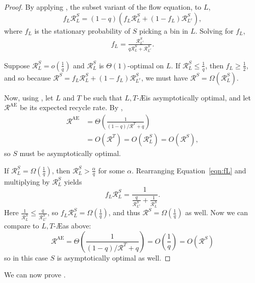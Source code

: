 \begin{proof}
	By applying , the subset variant of the
	flow equation, to $L$, 
	\[ f_L \mathcal{R}_L^S = (1-q)(f_L \mathcal{R}_L^S + (1-f_L) \mathcal{R}_{L^c}^S), \]
	where $f_L$ is the stationary probability of $S$ picking a bin in $L$.
	Solving for $f_L$,
	\begin{align} 
		f_L = \frac{\mathcal{R}_{L^c}^S}{q\mathcal{R}_L^S +
          \mathcal{R}_{L^c}^S}. \label{eqn:fL}
	\end{align}

	Suppose $\mathcal{R}_L^S = o\left(\frac{1}{q}\right)$ and $\mathcal{R}_L^S$
	is $\Theta(1)$-optimal on $L$. If $\mathcal{R}_L^S\leq \frac{1}{q}$, then
	$f_L \geq \frac{1}{2}$, and so because $\mathcal{R}^S = f_L\mathcal{R}_L^S
	+ (1-f_L)\mathcal{R}_{L^c}^S$, we must have $\mathcal{R}^S =
	\Omega(\mathcal{R}_L^S)$.

	Now, using , let $L$ and $T$ be such that $L,T$-\AE is
	asymptotically optimal, and let $\mathcal{R}^\textrm{AE}$ be its expected
	recycle rate. By ,
	\begin{align*} 
		\mathcal{R}^\mathrm{AE} &= \Theta\left( \frac{1}{(1-q)/\mathcal{R}^T + q}\right) \\
		&= O\left(\mathcal{R}^T\right) = O\left(\mathcal{R}_L^S\right) = O\left(\mathcal{R}^S\right),\label{eqn:RAE}
	\end{align*} 
	so $S$ must be asymptotically optimal.

	If $\mathcal{R}_L^S = \Omega\left(\frac{1}{q}\right)$, then
	$\mathcal{R}_L^S > \frac{\alpha}{q}$ for some $\alpha$. Rearranging
	Equation~\eqref{eqn:fL} and multiplying by
	$\mathcal{R}_L^S$ yields
	\[ f_L \mathcal{R}_L^S = \frac{1}{\frac{q}{\mathcal{R}_{L^c}^S} + \frac{1}{\mathcal{R}_L^S}}. \]
	Here $\frac{1}{\mathcal{R}_L^S} \leq \frac{q}{\mathcal{R}_{L^c}^S}$, so
	$f_L\mathcal{R}_L^S = \Omega\left(\frac{1}{q}\right)$, and thus
	$\mathcal{R}^S = \Omega\left(\frac{1}{q}\right)$ as well. Now we can
	compare to $L,T$-\AE as above:
	\[ 	\mathcal{R}^\mathrm{AE}
		= \Theta\left( \frac{1}{(1-q)/\mathcal{R}^T + q}\right)
		= O\left(\frac{1}{q}\right)
		= O\left(\mathcal{R}^S\right)
		\]
	so in this case $S$ is asymptotically optimal as well.
\end{proof}	

We can now prove .

